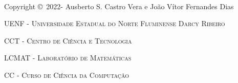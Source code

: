     \newpage
    ~\vfill
    \thispagestyle{empty}
    
    \noindent Copyright \copyright\ 2022-\the\year{} Ausberto S. Castro Vera e João Vítor Fernandes Dias  %
    
    
    \noindent \textsc{UENF - Universidade Estadual do Norte Fluminense Darcy Ribeiro} %
    
    \noindent \textsc{CCT - Centro de Ciência e Tecnologia} %
    
    \noindent \textsc{LCMAT - Laboratório de Matemáticas} %
    
    \noindent \textsc{CC - Curso de Ciência da Computação} %
    
    
